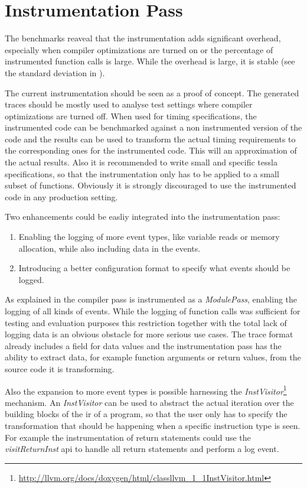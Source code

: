 \section{Instrumentation Pass}

The benchmarks reaveal that the instrumentation adds significant overhead, especially when compiler optimizations are turned on or the percentage of instrumented function calls is large.
While the overhead is large, it is stable (see the standard deviation in ).

The current instrumentation should be seen as a proof of concept.
The generated traces should be mostly used to analyse test settings where compiler optimizations are turned off.
When used for timing specifications, the instrumented code can be benchmarked against a non instrumented version of the code and the results can be used to transform the actual timing requirements to the corresponding ones for the instrumented code.
This will an approximation of the actual results.
Also it is recommended to write small and specific \gls{tessla} specifications, so that the instrumentation only has to be applied to a small subset of functions.
Obviously it is strongly discouraged to use the instrumented code in any production setting.

Two enhancements could be easliy integrated into the instrumentation pass:
\begin{enumerate}
  \item Enabling the logging of more event types, like variable reads or memory allocation, while also including data in the events.
  \item Introducing a better configuration format to specify what events should be logged.
\end{enumerate}

As explained in  the compiler pass is instrumented as a \emph{ModulePass}, enabling the logging of all kinds of events.
While the logging of function calls was sufficient for testing and evaluation purposes this restriction together with the total lack of logging data is an obvious obstacle for more serious use cases.
The trace format already includes a field for data values and the instrumentation pass has the ability to extract data, for example function arguments or return values, from the source code it is transforming.

Also the expansion to more event types is possible harnessing the \emph{InstVisitor}\footnote{\url{http://llvm.org/docs/doxygen/html/classllvm_1_1InstVisitor.html}} mechanism.
An \emph{InstVisitor} can be used to abstract the actual iteration over the building blocks of the \gls{ir} of a program, so that the user only has to specify the transformation that should be happening when a specific instruction type is seen.
For example the instrumentation of return statements could use the \emph{visitReturnInst} \gls{api} to handle all return statements and perform a log event.

